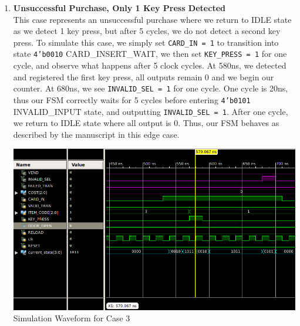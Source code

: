 \documentclass{article}
\begin{document}
\begin{enumerate}
    \item \textbf{Unsuccessful Purchase, Only 1 Key Press Detected}\\
   This case represents an unsuccessful purchase where we return to IDLE state as we detect 1 key press, but after 5 cycles, we do not detect a second key press. To simulate this case, we simply set \texttt{CARD\_IN = 1} to transition into state \texttt{4'b0010} CARD\_INSERT\_WAIT, we then set \texttt{KEY\_PRESS = 1} for one cycle, and observe what happens after 5 clock cycles. At 580ns, we detected and registered the first key press, all outputs remain 0 and we begin our counter. At 680ns, we see \texttt{INVALID\_SEL = 1} for one cycle. One cycle is 20ns, thus our FSM correctly waits for 5 cycles before entering \texttt{4'b0101} INVALID\_INPUT state, and outputting \texttt{INVALID\_SEL = 1}. After one cycle, we return to IDLE state where all output is 0. Thus, our FSM behaves as described by the manuscript in this edge case.
    \begin{center}
        \includegraphics[scale=0.5]{waveform-3.png} \\
        \caption{Simulation Waveform for Case 3}
    \end{center}
    \par
    

\end{enumerate}
\end{document}
